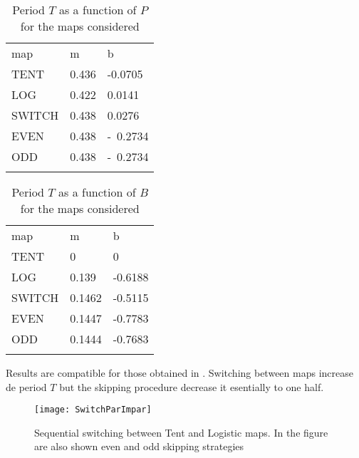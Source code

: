 \begin{table}
\caption{Period $T$ as a function of $P$ for the maps considered}
\label{tabla:tab1}       %
\begin{tabular}{lll}
\hline\noalign{\smallskip}
map & m & b  \\
\noalign{\smallskip}\hline\noalign{\smallskip}
TENT&0.436 & -0.0705 \\
LOG &0.422 & 0.0141 \\
SWITCH &0.438 & 0.0276 \\
EVEN &0.438 & -~0.2734 \\
ODD &0.438 & -~0.2734 \\
\noalign{\smallskip}\hline
\end{tabular}
\end{table}
%
\begin{table}
\caption{Period $T$ as a function of $B$ for the maps considered}
\label{tabla:tab2}       %
\begin{tabular}{lll}
\hline\noalign{\smallskip}
map & m & b  \\
\noalign{\smallskip}\hline\noalign{\smallskip}
TENT&0 & 0 \\
LOG &0.139 & -0.6188 \\
SWITCH &0.1462 & -0.5115 \\
EVEN &0.1447 & -0.7783 \\
ODD &0.1444 & -0.7683 \\
\noalign{\smallskip}\hline
\end{tabular}
\end{table}
Results are compatible for those obtained in \cite{Nagaraj2008}. Switching between maps increase de period $T$ but the skipping procedure decrease it esentially to one half. 
% 

\begin{figure}
	\texttt{[image: SwitchParImpar]}
	\caption{Sequential switching between Tent and Logistic maps. In the figure are also shown even and odd skipping strategies} \label{fig:seq}
\end{figure}

